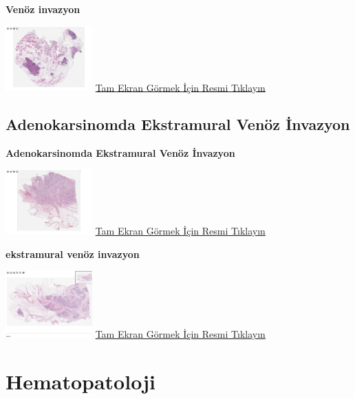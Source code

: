 \documentclass[
  letterpaper,
  DIV=11,
  numbers=noendperiod]{scrreprt}
\begin{document}
\textbf{Venöz invazyon}

\href{https://images.patolojiatlasi.com/venous-invasion/HE.html}{\includegraphics[width=0.25\textwidth,height=\textheight]{./screenshots/venous-invasion_screenshot.png}}
\href{https://images.patolojiatlasi.com/venous-invasion/HE.html}{Tam
Ekran Görmek İçin Resmi Tıklayın}

\hypertarget{sec-adenokarsinomda-ekstramural-venoz-invazyon}{%
\chapter{Adenokarsinomda Ekstramural Venöz
İnvazyon}\label{sec-adenokarsinomda-ekstramural-venoz-invazyon}}

\textbf{Adenokarsinomda Ekstramural Venöz İnvazyon}

\href{https://images.patolojiatlasi.com/extramuralvenousinvasion/HE.html}{\includegraphics[width=0.25\textwidth,height=\textheight]{./screenshots/extramuralvenousinvasion_screenshot.png}}
\href{https://images.patolojiatlasi.com/extramuralvenousinvasion/HE.html}{Tam
Ekran Görmek İçin Resmi Tıklayın}

\textbf{ekstramural venöz invazyon}

\href{https://images.patolojiatlasi.com/extramural-venous-invasion/HE.html}{\includegraphics[width=0.25\textwidth,height=\textheight]{./screenshots/extramural-venous-invasion_screenshot.png}}
\href{https://images.patolojiatlasi.com/extramural-venous-invasion/HE.html}{Tam
Ekran Görmek İçin Resmi Tıklayın}

\part{Hematopatoloji}
\end{document}
